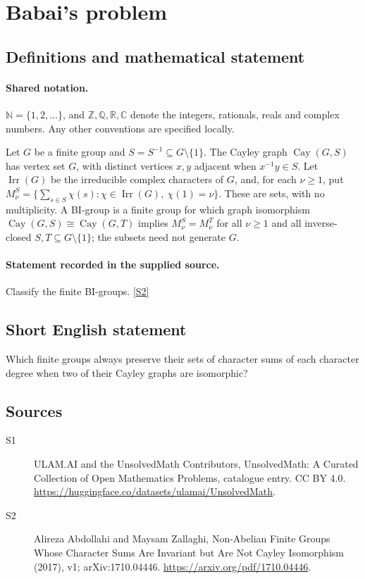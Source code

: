 \documentclass[11pt]{article}
\newcommand{\sref}[2]{\hyperlink{source:#1:#2}{[S#2]}}
\begin{document}
\section{Babai's problem}\label{statement}

\subsection{Definitions and mathematical statement}

\paragraph{Shared notation.}$\mathbb N=\{1,2,\ldots\}$, and $\mathbb Z,\mathbb Q,\mathbb R,\mathbb C$ denote the integers, rationals, reals and complex numbers. Any other conventions are specified locally.


Let $G$ be a finite group and $S=S^{-1}\subseteq G\setminus\{1\}$. The Cayley graph $\operatorname{Cay}(G,S)$ has vertex set $G$, with distinct vertices $x,y$ adjacent when $x^{-1}y\in S$. Let $\operatorname{Irr}(G)$ be the irreducible complex characters of $G$, and, for each $\nu\geq1$, put $M_\nu^S=\{\sum_{s\in S}\chi(s):\chi\in\operatorname{Irr}(G),\ \chi(1)=\nu\}$. These are sets, with no multiplicity. A BI-group is a finite group for which graph isomorphism $\operatorname{Cay}(G,S)\cong\operatorname{Cay}(G,T)$ implies $M_\nu^S=M_\nu^T$ for all $\nu\geq1$ and all inverse-closed $S,T\subseteq G\setminus\{1\}$; the subsets need not generate $G$.
\paragraph{Statement recorded in the supplied source.}
Classify the finite BI-groups. \sref{statement}{2}
\subsection{Short English statement}
Which finite groups always preserve their sets of character sums of each character degree when two of their Cayley graphs are isomorphic?
\subsection{Sources}
\begin{description}
\item[\hypertarget{source:statement:1}{S1}] ULAM.AI and the UnsolvedMath Contributors, UnsolvedMath: A Curated Collection of Open Mathematics Problems, catalogue entry. CC BY 4.0. \url{https://huggingface.co/datasets/ulamai/UnsolvedMath}.
\item[\hypertarget{source:statement:2}{S2}] Alireza Abdollahi and Maysam Zallaghi, Non-Abelian Finite Groups Whose Character Sums Are Invariant but Are Not Cayley Isomorphism (2017), v1; arXiv:1710.04446. \url{https://arxiv.org/pdf/1710.04446}.
\end{description}
\label{end:statement}
\end{document}
